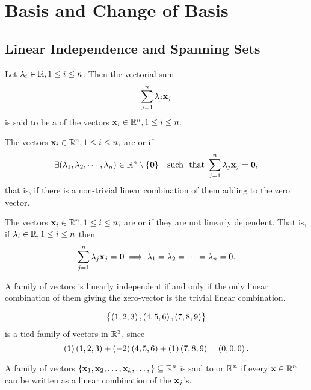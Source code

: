 \section{Basis and Change of Basis}

\subsection{Linear Independence and Spanning Sets}
\begin{df}
Let $\lambda_i \in \mathbb{R}, 1\leq i\leq n$. Then
the vectorial sum
$$\sum_{j = 1} ^n \lambda_j\mathbf{  x}_j$$ is said to be a  of the vectors  $\mathbf{  x}_i \in \mathbb{R} ^n,  1 \leq i \leq n.$
\end{df}

\begin{df}
The vectors $\mathbf{  x}_i \in \mathbb{R} ^n,  1 \leq i \leq n,$ are  or  if
$$\exists (\lambda_1, \lambda_2, \cdots , \lambda_n) \in \mathbb{R} ^n \setminus \{{\mathbf 0}\} \ \ {\text{ such \ that}\ }
\sum_{j = 1} ^n \lambda_j\mathbf{  x}_j = \mathbf{ 0},$$that is, if there is a
non-trivial linear combination of them adding to the zero vector.
\end{df}\begin{df}
The vectors $\mathbf{  x}_i \in \mathbb{R} ^n,  1 \leq i \leq n,$ are  or  if they are not linearly dependent. That
is, if $\lambda_i \in \mathbb{R}, 1\leq i \leq n  $
then
$$\sum_{j = 1} ^n \lambda_j\mathbf{  x}_j = \mathbf{ 0} \implies   \lambda_1 = \lambda_2= \cdots = \lambda_n = 0.$$
\end{df}
\begin{rem}
A family of vectors is linearly independent if and only if the
only linear combination of them giving the zero-vector is the
trivial linear combination.
\end{rem}


\begin{exa}

$$\left\{\left( 1 , 2 , 3 \right), \left( 4 , 5 , 6 \right), \left( 7 , 8 ,
9 \right)\right\}$$is a tied family of vectors in $\mathbb{R}^3$, since
$$(1)\left( 1 , 2 , 3 \right) + (-2) \left( 4 , 5 , 6 \right) + (1)\left( 7 , 8 ,
9 \right) = \left( 0 , 0 , 0 \right).$$
\end{exa}

\begin{df}
A family of vectors $\{\mathbf{ x}_1, \mathbf{ x}_2, \ldots , \mathbf{ x}_k, \ldots, \}
\subseteq \mathbb{R} ^n$ is said to  or  $\mathbb{R} ^n$ if every
$\mathbf{ x}\in \mathbb{R} ^n$ can be written as a linear combination of the
$\mathbf{ x}_j$'s.            
\end{df}

